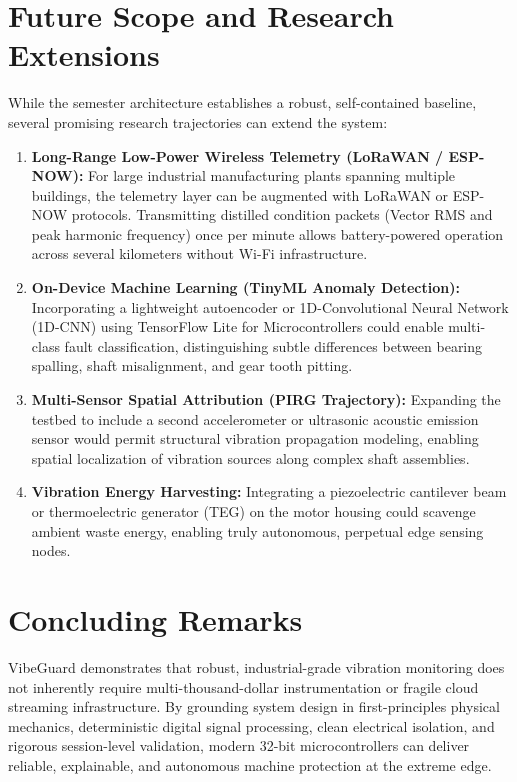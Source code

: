 \section{Future Scope and Research Extensions}
While the semester architecture establishes a robust, self-contained baseline, several promising research trajectories can extend the system:

\begin{enumerate}
    \item \textbf{Long-Range Low-Power Wireless Telemetry (LoRaWAN / ESP-NOW):} For large industrial manufacturing plants spanning multiple buildings, the telemetry layer can be augmented with LoRaWAN or ESP-NOW protocols. Transmitting distilled condition packets (Vector RMS and peak harmonic frequency) once per minute allows battery-powered operation across several kilometers without Wi-Fi infrastructure.
    \item \textbf{On-Device Machine Learning (TinyML Anomaly Detection):} Incorporating a lightweight autoencoder or 1D-Convolutional Neural Network (1D-CNN) using TensorFlow Lite for Microcontrollers could enable multi-class fault classification, distinguishing subtle differences between bearing spalling, shaft misalignment, and gear tooth pitting.
    \item \textbf{Multi-Sensor Spatial Attribution (PIRG Trajectory):} Expanding the testbed to include a second accelerometer or ultrasonic acoustic emission sensor would permit structural vibration propagation modeling, enabling spatial localization of vibration sources along complex shaft assemblies.
    \item \textbf{Vibration Energy Harvesting:} Integrating a piezoelectric cantilever beam or thermoelectric generator (TEG) on the motor housing could scavenge ambient waste energy, enabling truly autonomous, perpetual edge sensing nodes.
\end{enumerate}

\section{Concluding Remarks}
VibeGuard demonstrates that robust, industrial-grade vibration monitoring does not inherently require multi-thousand-dollar instrumentation or fragile cloud streaming infrastructure. By grounding system design in first-principles physical mechanics, deterministic digital signal processing, clean electrical isolation, and rigorous session-level validation, modern 32-bit microcontrollers can deliver reliable, explainable, and autonomous machine protection at the extreme edge.
